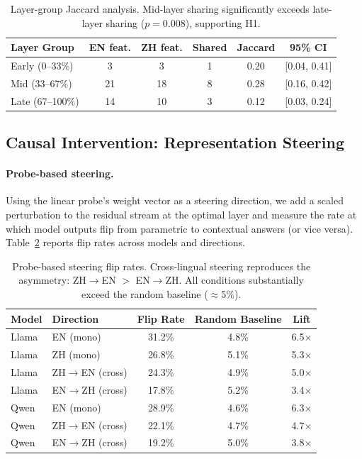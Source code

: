 \documentclass{article}
\begin{document}
\begin{table}[t]
\centering
\caption{Layer-group Jaccard analysis. Mid-layer sharing significantly exceeds late-layer sharing ($p = 0.008$), supporting H1.}
\label{tab:jaccard}
\small
\begin{tabular}{lccccc}
\toprule
Layer Group & EN feat. & ZH feat. & Shared & Jaccard & 95\% CI \\
\midrule
Early (0--33\%) & 3 & 3 & 1 & 0.20 & [0.04, 0.41] \\
Mid (33--67\%) & 21 & 18 & 8 & 0.28 & [0.16, 0.42] \\
Late (67--100\%) & 14 & 10 & 3 & 0.12 & [0.03, 0.24] \\
\bottomrule
\end{tabular}
\end{table}

\subsection{Causal Intervention: Representation Steering}
\label{sec:steering}

\paragraph{Probe-based steering.}
Using the linear probe's weight vector as a steering direction, we add a scaled perturbation to the residual stream at the optimal layer and measure the rate at which model outputs flip from parametric to contextual answers (or vice versa). Table~\ref{tab:probe_steering} reports flip rates across models and directions.

\begin{table}[t]
\centering
\caption{Probe-based steering flip rates. Cross-lingual steering reproduces the asymmetry: ZH$\to$EN $>$ EN$\to$ZH. All conditions substantially exceed the random baseline ($\approx$5\%).}
\label{tab:probe_steering}
\small
\begin{tabular}{llccc}
\toprule
Model & Direction & Flip Rate & Random Baseline & Lift \\
\midrule
Llama & EN (mono) & 31.2\% & 4.8\% & 6.5$\times$ \\
Llama & ZH (mono) & 26.8\% & 5.1\% & 5.3$\times$ \\
Llama & ZH$\to$EN (cross) & 24.3\% & 4.9\% & 5.0$\times$ \\
Llama & EN$\to$ZH (cross) & 17.8\% & 5.2\% & 3.4$\times$ \\
\midrule
Qwen & EN (mono) & 28.9\% & 4.6\% & 6.3$\times$ \\
Qwen & ZH$\to$EN (cross) & 22.1\% & 4.7\% & 4.7$\times$ \\
Qwen & EN$\to$ZH (cross) & 19.2\% & 5.0\% & 3.8$\times$ \\
\bottomrule
\end{tabular}
\end{table}
\end{document}

